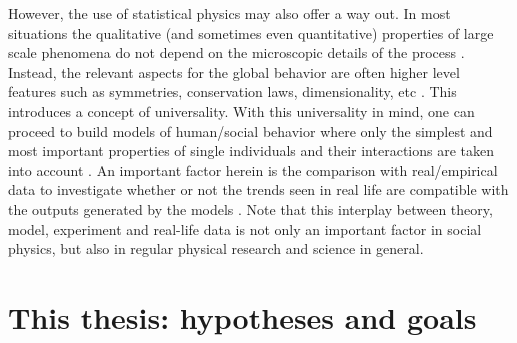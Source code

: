 \documentclass[11 pt , letterpaper , twoside , openright]{book}
\begin{document}
However, the use of statistical physics may also offer a way out. In most situations the qualitative (and sometimes even quantitative) properties of large scale phenomena do not depend on the microscopic details of the process \cite{Castellano2009}. Instead, the relevant aspects for the global behavior are often higher level features such as symmetries, conservation laws, dimensionality, etc \cite{Castellano2009}. This introduces a concept of universality. With this universality in mind, one can proceed to build models of human/social behavior where only the simplest and most important properties of single individuals and their interactions are taken into account \cite{Castellano2009}. An important factor herein is the comparison with real/empirical data to investigate whether or not the trends seen in real life are compatible with the outputs generated by the models \cite{Castellano2009}. Note that this interplay between theory, model, experiment and real-life data is not only an important factor in social physics, but also in regular physical research and science in general.




\section{This thesis: hypotheses and goals}
\end{document}
